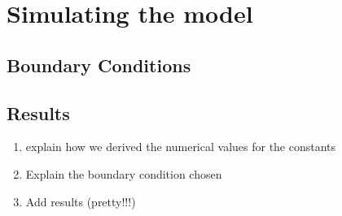 \section{Simulating the model}
\subsection{Boundary Conditions}
\subsection{Results}
\begin{enumerate}
    \item explain how we derived the numerical values for the constants
    \item Explain the boundary condition chosen
    \item Add results (pretty!!!)
\end{enumerate}